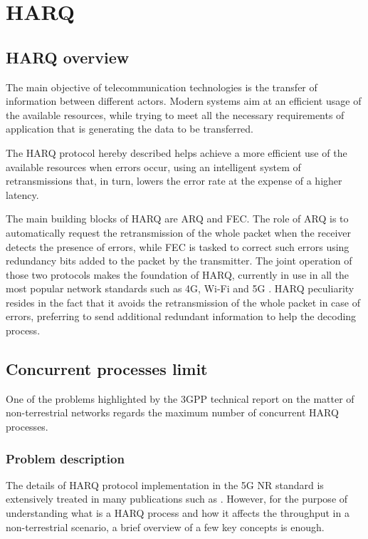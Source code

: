 
\chapter{HARQ}
\label{chp:harq}

\section{HARQ overview}
The main objective of telecommunication technologies is the transfer of information between different actors. Modern systems aim at an efficient usage of the available resources, while trying to meet all the necessary requirements of application that is generating the data to be transferred. 

The \ac{HARQ} protocol hereby described helps achieve a more efficient use of the available resources when errors occur, using an intelligent system of retransmissions that, in turn, lowers the error rate at the expense of a higher latency.

The main building blocks of \ac{HARQ} are \ac{ARQ} and \ac{FEC}. The role of \ac{ARQ} is to automatically request the retransmission of the whole packet when the receiver detects the presence of errors, while \ac{FEC} is tasked to correct such errors using redundancy bits added to the packet by the transmitter. The joint operation of those two protocols makes the foundation of \ac{HARQ}, currently in use in all the most popular network standards such as 4G, Wi-Fi and 5G \cite{3gpp-38-series}. \ac{HARQ} peculiarity resides in the fact that it avoids the retransmission of the whole packet in case of errors, preferring to send additional redundant information to help the decoding process.

\section{Concurrent processes limit}
\label{sec:harq-conc-proc}

One of the problems highlighted by the \ac{3GPP} technical report \cite{3gpp-tr-38.811} on the matter of non-terrestrial networks regards the maximum number of concurrent \ac{HARQ} processes. 

\subsection{Problem description}
The details of \ac{HARQ} protocol implementation in the 5G \ac{NR} standard is extensively treated in many publications such as \cite{harq-wireless-communications-survey}. However, for the purpose of understanding what is a \ac{HARQ} process and how it affects the throughput in a non-terrestrial scenario, a brief overview of a few key concepts is enough.

